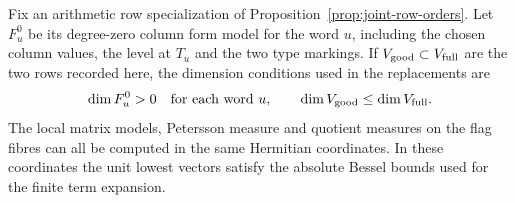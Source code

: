 \begin{established}\label{hyp:real-row-measured-models}
Fix an arithmetic row specialization of Proposition~\ref{prop:joint-row-orders}. Let \(F_u^0\) be
its degree-zero column form model for the word \(u\), including
the chosen column values, the level at \(T_u\) and the two
type markings. If \(V_{\rm good}\subset V_{\rm full}\) are the two rows recorded here, the dimension conditions used in the replacements are
\[
 \dim F_u^0>0\quad\text{for each word }u,\qquad\dim V_{\rm good}\le\dim V_{\rm full}.
\]
The local matrix models, Petersson measure and quotient measures on the flag fibres can all be computed in the same Hermitian coordinates. In these coordinates the unit lowest vectors satisfy the absolute Bessel bounds used for the finite term expansion.
\end{established}
